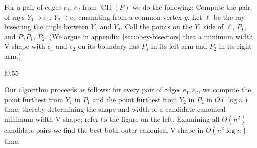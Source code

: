\documentclass{llncs}
\DeclareMathOperator{\conv}{CH}
\begin{document}
For a pair of edges $e_1$, $e_2$ from $\conv(P)$ we do the following:
Compute the pair of rays $Y_1 \supset e_1$, $Y_2 \supset e_2$
emanating from a common vertex $y$.  Let $\ell$ be the ray bisecting the
angle between $Y_1$ and $Y_2$.  
Call the points on the $Y_1$ side of $\ell$, $P_1$, and $P \setminus P_1$, $P_2$.
(We argue in appendix~\ref{sec:obey-bisectors} that a minimum width V-shape 
with $e_1$ and $e_2$ on its boundary has $P_1$ in its left arm and $P_2$ in its right arm.)





\begin{wrapfigure}[10]{l}{0.55 \textwidth}
\end{wrapfigure}



Our algorithm proceeds as follows: for every pair of edges $e_1,e_2$,
we compute the point furthest from $Y_1$ in $P_1$ and the point
furthest from $Y_2$ in $P_2$ in $O(\log n)$ time, thereby determining the shape and width
of a candidate canonical minimum-width V-shape;
refer to the figure on the left. Examining all $O(n^2)$ candidate pairs we find the
best both-outer canonical V-shape in $O(n^2\log n)$ time.
\fi
\end{document}
